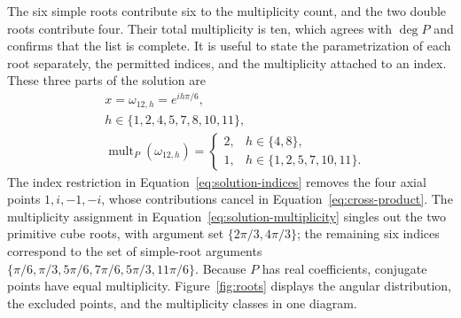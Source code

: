 \documentclass[11pt,a4paper]{article}
\numberwithin{equation}{section}
\theoremstyle{uprightpaper}
\newcommand{\mult}{\operatorname{mult}}
\begin{document}
The six simple roots contribute six to the multiplicity count, and
the two double roots contribute four. Their total multiplicity is ten,
which agrees with $\deg P$ and confirms that the list is complete.
It is useful to state the parametrization of each root separately,
the permitted indices, and the multiplicity attached to an index.
These three parts of the solution are
\begin{subequations}\label{eq:solution}
\begin{align}
 &x=\omega_{12,h}=e^{ih\pi/6},\label{eq:solution-param}\\
 &h\in\{1,2,4,5,7,8,10,11\},\label{eq:solution-indices}\\
 &\mult_P(\omega_{12,h})=
 \begin{cases}2,&h\in\{4,8\},\\1,&h\in\{1,2,5,7,10,11\}.
 \end{cases}\label{eq:solution-multiplicity}
\end{align}
\end{subequations}
The index restriction in Equation~\eqref{eq:solution-indices} removes the
four axial points $1,i,-1,-i$, whose contributions cancel in
Equation~\eqref{eq:cross-product}. The multiplicity assignment in
Equation~\eqref{eq:solution-multiplicity} singles out the two primitive
cube roots, with argument set $\{2\pi/3,4\pi/3\}$; the remaining six
indices correspond to the set of simple-root arguments
$\{\pi/6,\pi/3,5\pi/6,7\pi/6,5\pi/3,11\pi/6\}$.
Because $P$ has real coefficients, conjugate points have equal
multiplicity. Figure~\ref{fig:roots} displays the angular distribution,
the excluded points, and the multiplicity classes in one diagram.
\end{document}
